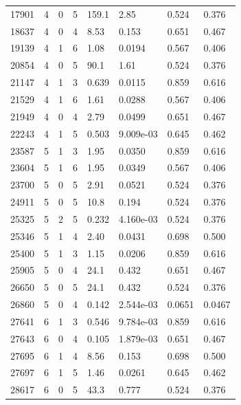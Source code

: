 \documentclass[preview]{standalone}
\begin{document}
{{{\begin{tabular}{L{1.2cm}C{1.2cm} C{0.3cm}C{0.5cm} C{1.4cm}C{1.4cm} C{1.4cm}C{1.4cm}}
  17901  &     4  & 0     &  5 &  159.1  & 2.85  & 0.524 &  0.376   \\ 
  18637  &     4  & 0     &  4 &  8.53  & 0.153  & 0.651 &  0.467   \\ 
  19139  &     4  & 1     &  6 &  1.08  & 0.0194  & 0.567 &  0.406   \\ 
  20854  &     4  & 0     &  5 &  90.1  & 1.61  & 0.524 &  0.376   \\ 
  21147  &     4  & 1     &  3 &  0.639  & 0.0115  & 0.859 &  0.616   \\ 
  21529  &     4  & 1     &  6 &  1.61  & 0.0288  & 0.567 &  0.406   \\ 
  21949  &     4  & 0     &  4 &  2.79  & 0.0499  & 0.651 &  0.467   \\ 
  22243  &     4  & 1     &  5 &  0.503  & 9.009e-03  & 0.645 &  0.462   \\ 
  23587  &     5  & 1     &  3 &  1.95  & 0.0350  & 0.859 &  0.616   \\ 
  23604  &     5  & 1     &  6 &  1.95  & 0.0349  & 0.567 &  0.406   \\ 
  23700  &     5  & 0     &  5 &  2.91  & 0.0521  & 0.524 &  0.376   \\ 
  24911  &     5  & 0     &  5 &  10.8  & 0.194  & 0.524 &  0.376   \\ 
  25325  &     5  & 2     &  5 &  0.232  & 4.160e-03  & 0.524 &  0.376   \\ 
  25346  &     5  & 1     &  4 &  2.40  & 0.0431  & 0.698 &  0.500   \\ 
  25400  &     5  & 1     &  3 &  1.15  & 0.0206  & 0.859 &  0.616   \\ 
  25905  &     5  & 0     &  4 &  24.1  & 0.432  & 0.651 &  0.467   \\ 
  26650  &     5  & 0     &  5 &  24.1  & 0.432  & 0.524 &  0.376   \\ 
  26860  &     5  & 0     &  4 &  0.142  & 2.544e-03  & 0.0651 &  0.0467   \\ 
  27641  &     6  & 1     &  3 &  0.546  & 9.784e-03  & 0.859 &  0.616   \\ 
  27643  &     6  & 0     &  4 &  0.105  & 1.879e-03  & 0.651 &  0.467   \\ 
  27695  &     6  & 1     &  4 &  8.56  & 0.153  & 0.698 &  0.500   \\ 
  27697  &     6  & 1     &  5 &  1.46  & 0.0261  & 0.645 &  0.462   \\ 
  28617  &     6  & 0     &  5 &  43.3  & 0.777  & 0.524 &  0.376   \\ 

\end{tabular}}}}
\end{document}
